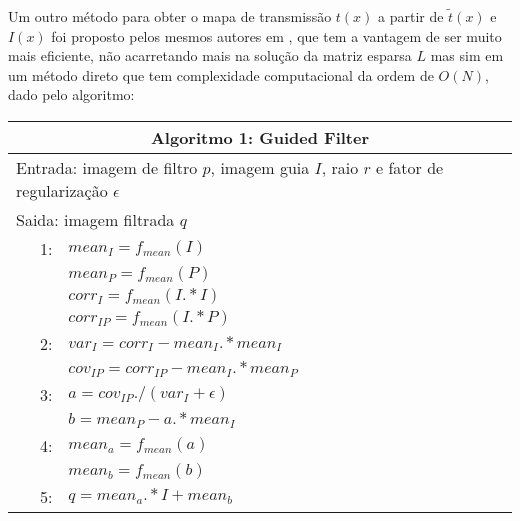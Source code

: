 \documentclass[12pt,openany, oneside,
 article, 
 a4paper, hyphens, english, brazil]{abntex2}
\begin{document}
Um outro método para obter o mapa de transmissão $t(x)$ a partir de $\tilde{t}(x)$ e $I(x)$ foi proposto pelos mesmos autores em \cite{guided_filtering}, que tem a vantagem de ser muito mais eficiente, não acarretando mais na solução da matriz esparsa $L$ mas sim em um método direto que tem complexidade computacional da ordem de $O(N)$, dado pelo algoritmo:

\begin{tabularx}{\textwidth}{rl}
\toprule
\multicolumn{2}{c}{Algoritmo 1: Guided Filter}\\
\midrule
\multicolumn{2}{l}{Entrada: imagem de filtro $p$, imagem guia $I$, raio $r$ e fator de regularização $\epsilon$}\\
\multicolumn{2}{l}{Saida: imagem filtrada $q$}\\
\midrule
1: & $mean_I = f_{mean}(I)$\\
& $mean_P = f_{mean}(P)$\\
& $corr_I = f_{mean}(I.*I)$\\
& $corr_{IP} = f_{mean}(I.*P)$\\
2: & $var_I = corr_I - mean_I .* mean_I$\\
& $cov_{IP} = corr_{IP} - mean_I .* mean_P$\\
3: & $a = cov_{IP} ./ (var_I + \epsilon)$\\
& $b = mean_P - a .* mean_I$\\
4: & $mean_a = f_{mean}(a)$ \\
& $mean_b = f_{mean}(b)$ \\
5: & $q = mean_a .* I + mean_b$ \\
\bottomrule
\end{tabularx}


	
\end{document}
